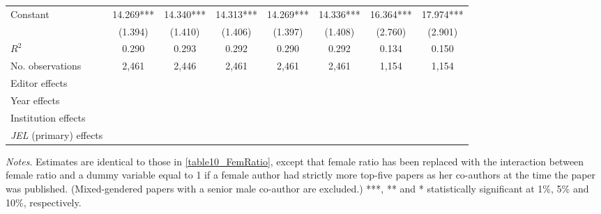 \begin{table}
\begin{adjustwidth}{-0.085cm}{}
\begin{threeparttable}
\begin{tabular}{p{2.64cm}SSSSSSS}
            Constant                      &      14.269***&      14.340***&      14.313***&      14.269***&      14.336***&      16.364***&      17.974***\\
                                          &     (1.394)   &     (1.410)   &     (1.406)   &     (1.397)   &     (1.408)   &     (2.760)   &     (2.901)   \\
            \midrule
            \(R^2\)                       &       0.290   &       0.293   &       0.292   &       0.290   &       0.292   &       0.134   &       0.150   \\
            No. observations              &       2,461   &       2,446   &       2,461   &       2,461   &       2,461   &       1,154   &       1,154   \\
            \midrule
            Editor effects       &           {}   &           {}   &           {}   &           {}   &           {}   &           {}   &           {}   \\
            Year effects                  &           {}   &           {}   &           {}   &           {}   &           {}   &           {}   &           {}   \\
            Institution effects           &           {}   &           {}   &           {}   &           {}   &           {}   &           {}   &           {}   \\
            \textit{JEL} (primary) effects&               &               &               &               &               &               &           {}   \\
            \bottomrule
        \end{tabular}
        \begin{tablenotes}
            \tiny
            \item \textit{Notes}. Estimates are identical to those in \autoref{table10_FemRatio}, except that female ratio has been replaced with the interaction between female ratio and a dummy variable equal to 1 if a female author had strictly more top-five papers as her co-authors at the time the paper was published. (Mixed-gendered papers with a senior male co-author are excluded.) ***, ** and * statistically significant at 1\%, 5\% and 10\%, respectively.
        \end{tablenotes}
    \end{threeparttable}
    \end{adjustwidth}
\end{table}